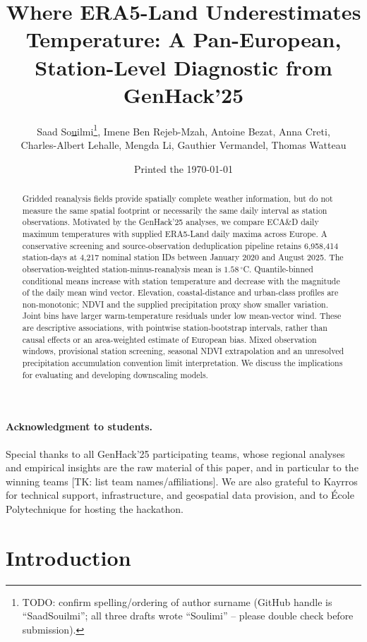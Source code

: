 \documentclass[a4paper,12pt,leqno]{article}
\title{Where ERA5-Land Underestimates Temperature: A Pan-European,
Station-Level Diagnostic from GenHack'25}
\author{Saad So\underline{u}ilmi\footnote{TODO: confirm spelling/ordering of
author surname (GitHub handle is ``SaadSouilmi''; all three drafts wrote
``Soulimi'' -- please double check before submission).},
Imene Ben Rejeb-Mzah, Antoine Bezat, Anna Creti,\\
Charles-Albert Lehalle, Mengda Li, Gauthier Vermandel, Thomas Watteau}
\date{Printed the \today}
\begin{document}
\maketitle

\begin{abstract}
Gridded reanalysis fields provide spatially complete weather information,
but do not measure the same spatial footprint or necessarily the same
daily interval as station observations. Motivated by the GenHack'25
analyses, we compare ECA\&D daily maximum temperatures with supplied
ERA5-Land daily maxima across Europe. A conservative screening and
source-observation deduplication pipeline retains 6,958,414 station-days
at 4,217 nominal station IDs between January 2020 and August 2025.
The observation-weighted station-minus-reanalysis mean is
$1.58\,^\circ$C. Quantile-binned conditional means increase with station
temperature and decrease with the magnitude of the daily mean wind
vector. Elevation, coastal-distance and urban-class profiles are
non-monotonic; NDVI and the supplied precipitation proxy show smaller
variation. Joint bins have larger warm-temperature residuals under low
mean-vector wind. These are descriptive associations, with pointwise
station-bootstrap intervals, rather than causal effects or an
area-weighted estimate of European bias. Mixed observation windows,
provisional station screening, seasonal NDVI extrapolation and an
unresolved precipitation accumulation convention limit interpretation.
We discuss the implications for evaluating and developing downscaling models.

\end{abstract}

\paragraph{Acknowledgment to students.} Special thanks to all GenHack'25
participating teams, whose regional analyses and empirical insights are
the raw material of this paper, and in particular to the winning teams
[TK: list team names/affiliations]. We are also grateful to Kayrros for
technical support, infrastructure, and geospatial data provision, and to
\'Ecole Polytechnique for hosting the hackathon.

\section{Introduction}
\label{sec:intro}
\end{document}
